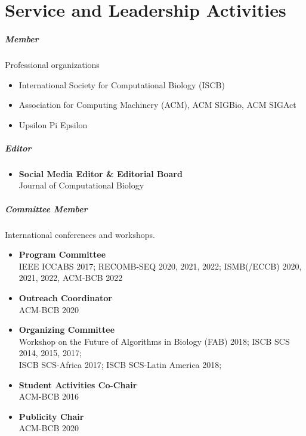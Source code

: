 \documentclass[10pt,letterpaper]{article}
\begin{document}
\section*{Service and Leadership Activities}




\subparagraph{Member} Professional organizations
\begin{itemize}
\item International Society for Computational Biology (ISCB)
\item Association for Computing Machinery (ACM), ACM SIGBio, ACM SIGAct
\item Upsilon Pi Epsilon
\end{itemize}

\subparagraph{Editor} 
\begin{itemize}[leftmargin=!,labelindent=5pt,itemindent=-15pt]
	\item \textbf{Social Media Editor \& Editorial Board}\\
	Journal of Computational Biology
\end{itemize}

\subparagraph{Committee Member} International conferences and workshops.
\begin{itemize}[leftmargin=!,labelindent=5pt,itemindent=-15pt]
    \item \textbf{Program Committee} \\ IEEE ICCABS 2017; RECOMB-SEQ 2020, 2021, 2022; ISMB(/ECCB) 2020, 2021, 2022, ACM-BCB 2022
    \item \textbf{Outreach Coordinator} \\ ACM-BCB 2020
    \item \textbf{Organizing Committee} \\
    Workshop on the Future of Algorithms in Biology (FAB) 2018; 
    ISCB SCS 2014, 2015, 2017;  \\
    ISCB SCS\nobreakdash-Africa 2017; 
    ISCB SCS-Latin America 2018;  
    \item \textbf{Student Activities Co-Chair} \\ ACM-BCB 2016
    \item \textbf{Publicity Chair} \\ ACM-BCB 2020
\end{itemize}
\end{document}
